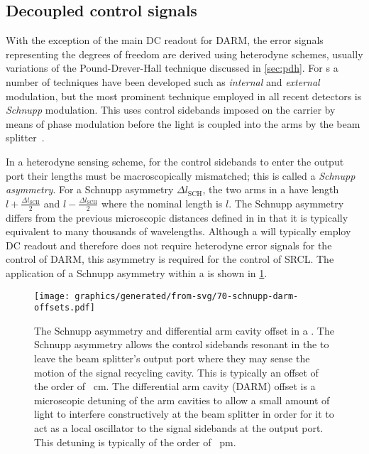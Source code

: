 \subsection{\label{sec:decoupled-sidebands}Decoupled control signals}
With the exception of the main \gls{DC} readout for \gls{DARM}, the error signals representing the degrees of freedom are derived using heterodyne schemes, usually variations of the Pound-Drever-Hall technique discussed in \cref{sec:pdh}. For \MI{}s a number of techniques have been developed such as \emph{internal} and \emph{external} modulation, but the most prominent technique employed in all recent detectors is \emph{Schnupp} modulation. This uses control sidebands imposed on the carrier by means of phase modulation before the light is coupled into the arms by the beam splitter~\cite{Heinzel1999}.

In a heterodyne sensing scheme, for the control sidebands to enter the output port their lengths must be macroscopically mismatched; this is called a \emph{Schnupp asymmetry}. For a Schnupp asymmetry $\Delta l_{\text{SCH}}$, the two arms in a \MI{} have length $l + \frac{\Delta l_{\text{SCH}}}{2}$ and $l - \frac{\Delta l_{\text{SCH}}}{2}$ where the nominal length is $l$. The Schnupp asymmetry differs from the previous microscopic distances defined in  in that it is typically equivalent to many thousands of wavelengths. Although a \DRFPMI{} will typically employ \gls{DC} readout and therefore does not require heterodyne error signals for the control of \gls{DARM}, this asymmetry is required for the control of \gls{SRCL}. The application of a Schnupp asymmetry within a \DRFPMI{} is shown in \cref{fig:schnupp-darm-offsets}.

\begin{figure}
  \centering
  \texttt{[image: graphics/generated/from-svg/70-schnupp-darm-offsets.pdf]}
  \caption[Schnupp asymmetry and differential arm cavity offset in a \DRFPMI{}]{\label{fig:schnupp-darm-offsets}The Schnupp asymmetry and differential arm cavity offset in a \DRFPMI{}. The Schnupp asymmetry allows the control sidebands resonant in the \MI{} to leave the beam splitter's output port where they may sense the motion of the signal recycling cavity. This is typically an offset of the order of \SI{}{\centi\meter}. The differential arm cavity (\gls{DARM}) offset is a microscopic detuning of the arm cavities to allow a small amount of light to interfere constructively at the beam splitter in order for it to act as a local oscillator to the signal sidebands at the output port. This detuning is typically of the order of \SI{}{\pico\meter}.}
\end{figure}

